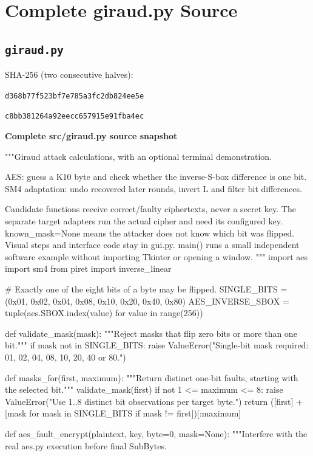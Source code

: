 \ifnum{}\relax\else\appendix\fi
\chapter{Complete giraud.py Source}
\section{\texttt{giraud.py}}\label{source:giraud}
\noindent SHA-256 (two consecutive halves):\par
\texttt{d368b77f523bf7e785a3fc2db824ee5e}\par
\texttt{c8bb381264a92eecc657915e91fba4ec}\par
\par\smallskip\noindent\textbf{Complete src/giraud.py source snapshot}\par
\begin{lightcode}[numbers=left,firstnumber=1]
"""Giraud attack calculations, with an optional terminal demonstration.

AES: guess a K10 byte and check whether the inverse-S-box difference is one bit.
SM4 adaptation: undo recovered later rounds, invert L and filter bit differences.

Candidate functions receive correct/faulty ciphertexts, never a secret key.
The separate target adapters run the actual cipher and need its configured key.
known_mask=None means the attacker does not know which bit was flipped.
Visual steps and interface code stay in gui.py. main() runs a small independent
software example without importing Tkinter or opening a window.
"""
import aes
import sm4
from piret import inverse_linear

# Exactly one of the eight bits of a byte may be flipped.
SINGLE_BITS = (0x01, 0x02, 0x04, 0x08, 0x10, 0x20, 0x40, 0x80)
AES_INVERSE_SBOX = tuple(aes.SBOX.index(value) for value in range(256))


def validate_mask(mask):
    """Reject masks that flip zero bits or more than one bit."""
    if mask not in SINGLE_BITS:
        raise ValueError("Single-bit mask required: 01, 02, 04, 08, 10, 20, 40 or 80.")


def masks_for(first, maximum):
    """Return distinct one-bit faults, starting with the selected bit."""
    validate_mask(first)
    if not 1 <= maximum <= 8:
        raise ValueError("Use 1..8 distinct bit observations per target byte.")
    return ([first] + [mask for mask in SINGLE_BITS if mask != first])[:maximum]


def aes_fault_encrypt(plaintext, key, byte=0, mask=None):
    """Interfere with the real aes.py execution before final SubBytes.


\end{lightcode}
